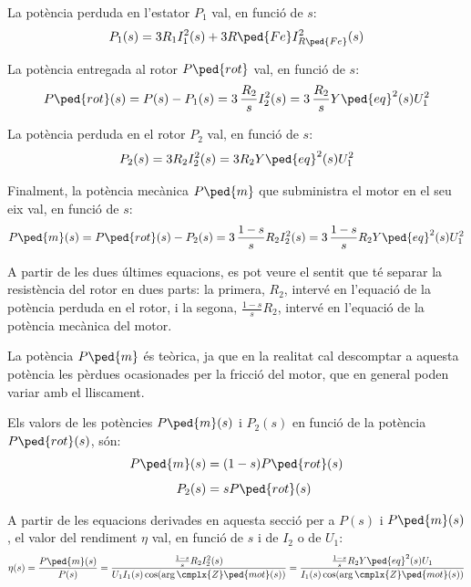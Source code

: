 La potència perduda en l'estator $P_1$ val, en funció de $s$:
\begin{equation}
    P_1(s)  =  3 R_1 I_1^2(s) + 3 R\ped{Fe} I_{R\ped{Fe}}^2(s)
\end{equation}

La potència entregada al rotor $P\ped{rot}$  val, en funció de $s$:
\begin{equation}
    P\ped{rot}(s)  =  P(s) - P_1(s) = 3 \,\frac{R_2}{s} I_2^2(s) = 3 \,\frac{R_2}{s} Y\ped{eq}^2(s) U_1^2
\end{equation}

La potència perduda en el rotor $P_2$ val, en funció de $s$:
\begin{equation}
    P_2(s)  =  3 R_2 I_2^2(s) = 3 R_2 Y\ped{eq}^2(s) U_1^2
\end{equation}

Finalment, la potència mecànica $P\ped{m}$ que subministra el motor en el seu eix val, en funció de $s$:
\begin{equation}\index{motors d'inducció!potència mecànica}
    P\ped{m}(s)  =  P\ped{rot}(s) - P_2(s) = 3 \,\frac{1-s}{s} R_2 I_2^2(s) = 3 \,\frac{1-s}{s} R_2 Y\ped{eq}^2(s) U_1^2 \label{eq:Pm-I2-U1}
\end{equation}

A partir de les dues últimes equacions, es pot veure el sentit que té separar la resistència del rotor en dues parts: la primera, $R_2$,  intervé en l'equació de la potència perduda en el rotor, i la segona, $\frac{1-s}{s} R_2$,  intervé en l'equació de la potència mecànica del motor.

La potència $P\ped{m}$  és teòrica, ja que en la realitat cal descomptar a aquesta potència les pèrdues ocasionades per la fricció del motor, que en general poden variar amb el lliscament.

Els valors de les potències $P\ped{m}(s)$ i  $P_2(s)$ en funció de la  potència    $P\ped{rot}(s)$, són:
\begin{subequations}
\begin{align}
    P\ped{m}(s) &=  (1-s) P\ped{rot}(s) \label{eq:Pm-Prot} \\[1ex]
    P_2(s) &=   s P\ped{rot}(s)
\end{align}
\end{subequations}

A partir de les equacions derivades en aquesta secció per a $P(s)$ i $P\ped{m}(s)$, el valor del rendiment $\eta$ val, en funció de $s$ i de $I_2$ o de $U_1$:
\begin{equation}\index{motors d'inducció!rendiment}
	\eta(s) = \frac{P\ped{m}(s)}{P(s)} = \frac{\frac{1-s}{s} R_2 I_2^2(s)}{U_1 I_1(s) \cos(\arg\cmplx{Z}\ped{mot}(s))} =  \frac{\frac{1-s}{s} R_2 Y\ped{eq}^2(s) U_1}{I_1(s) \cos(\arg\cmplx{Z}\ped{mot}(s))} \label{eq:mot-rendim}
\end{equation}

